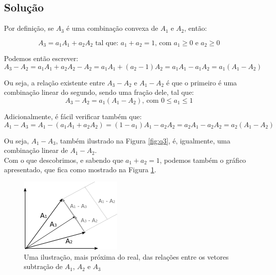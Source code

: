 \documentclass[a4paper,11pt,pagenumber=true]{article}
\theoremstyle{mytheor}
\begin{document}
        \subsection*{Solução}
        
            Por definição, se $A_3$ é uma combinação convexa de $A_1$ e $A_2$, então:
            
            \begin{equation}
                A_3 = a_1 A_1 + a_2 A_2 \text{ tal que: } a_1 + a_2 = 1 
                \text{, com } a_1 \geq 0 \text{ e } a_2 \geq 0 
            \end{equation}
            
            Podemos então escrever:
            \[
                A_3 - A_2 = a_1 A_1 + a_2 A_2 - A_2 = a_1 A_1 + (a_2 - 1) A_2 
                = a_1 A_1 - a_1 A_2 = a_1 (A_1 - A_2)
            \]
            
            Ou seja, a relação existente entre $A_3 - A_2$ e $A_1 - A_2$ é que o primeiro é uma combinação linear do segundo, sendo uma fração dele, tal que: 
            \begin{equation}
                A_3 - A_2 = a_1 (A_1 - A_2) \text{, com } 0 \leq a_1 \leq 1 
            \end{equation}
            
            Adicionalmente, é fácil verificar também que: 
            \[
                A_1 - A_3 = A_1 - (a_1 A_1 + a_2 A_2) = (1 - a_1) A_1 - a_2 A_2 
                = a_2 A_1 - a_2 A_2 = a_2 (A_1 - A_2)
            \]
            
            Ou seja, $A_1 - A_3$, também ilustrado na Figura \ref{fig:q3}, é, igualmente, uma combinação linear de $A_1 - A_2$. \\

            Com o que descobrimos, e sabendo que $a_1 + a_2 = 1$, podemos também  o gráfico apresentado, que fica como mostrado na Figura \ref{fig:q3a}.
            
            \begin{figure}[h]
                \centering
                \includegraphics{images/Q-3-A.png}
                \caption{
                    Uma ilustração, mais próxima do real, das relações 
                    entre os vetores subtração de $A_1$, $A_2$ e $A_3$
                }
                \label{fig:q3a}
            \end{figure}
            
\nocite{*}


\end{document}

